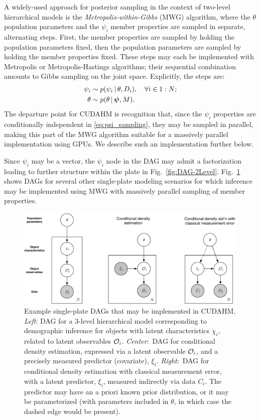 A widely-used approach for posterior sampling in the context of two-level hierarchical models is the \textit{Metropolis-within-Gibbs} (MWG) algorithm, where the $\theta$ population parameters and the $\psi_i$ member properties are sampled in separate, alternating steps.
First, the member properties are sampled by holding the population parameters fixed, then the population parameters are sampled by holding the member properties fixed.
These steps may each be implemented with Metropolis or Metropolis-Hastings algorithms; their sequential combination amounts to Gibbs sampling on the joint space.
Explicitly, the steps are:
\begin{align}
\psi_i &\sim p(\psi_i \,|\, \theta, D_i), \quad\forall i\in 1:N;
\label{eq:psi_sampling} \\
\theta &\sim p(\theta \,|\, \boldsymbol{\psi}, M).
\label{eq:theta_sampling}
\end{align}
The departure point for CUDAHM is recognition that, since the $\psi_i$ properties are conditionally independent in \eqref{eq:psi_sampling}, they may be sampled in parallel, making this part of the MWG algorithm suitable for a massively parallel implementation using GPUs.
We describe such an implementation further below.

Since $\psi_i$ may be a vector, the $\psi_i$ node in the DAG may admit a factorization leading to further structure within the plate in Fig.~\ref{fig:DAG-2Level}.
Fig.~\ref{fig:DAGs} shows DAGs for several other single-plate modeling scenarios for which inference may be implemented using MWG with massively parallel sampling of member properties.

\begin{figure}
\begin{center}
\includegraphics[width=.9\textwidth]{fig/DAGs-3}
\end{center}
\caption{Example single-plate DAGs that may be implemented in CUDAHM.
\emph{Left}: DAG for a 3-level hierarchical model corresponding to demographic inference for objects with latent characteristics $\chi_i$, related to latent observables $\mathcal{O}_i$.
\emph{Center}:~DAG for conditional density estimation, expressed via a latent observable $\mathcal{O}_i$, and a precisely measured predictor (covariate), $\xi_i$.
\emph{Right}:~DAG for conditional density estimation with classical measurement error, with a latent predictor, $\xi_i$, measured indirectly via data $C_i$.
The predictor may have an a priori known prior distribution, or it may be parameterized (with parameters included in $\theta$, in which case the dashed edge would be present).}
\label{fig:DAGs}
\end{figure}

